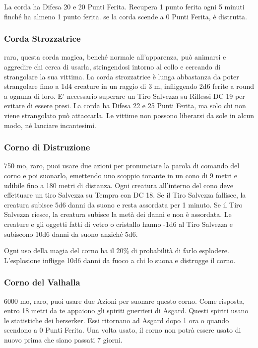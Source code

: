 \begin{multicols}{2}
La corda ha Difesa 20 e 20 Punti Ferita. Recupera 1 punto ferita ogni 5 minuti finché ha almeno 1 punto ferita. se la corda scende a 0 Punti Ferita, è distrutta.

\subsubsection*{Corda Strozzatrice}
rara, questa corda magica, benché normale all'apparenza, può animarsi e aggredire chi cerca di usarla, stringendosi intorno al collo e cercando di strangolare la sua vittima. La corda strozzatrice è lunga abbastanza da poter strangolare fimo a 1d4 creature in un raggio di 3 m, infliggendo 2d6 ferite a round a ognuna di loro. E' necessario superare un Tiro Salvezza su Riflessi DC 19 per evitare di essere presi. La corda ha Difesa 22 e 25 Punti Ferita, ma solo chi non viene strangolato può attaccarla. Le vittime non possono liberarsi da sole in alcun modo, né lanciare incantesimi.

\subsubsection*{Corno di Distruzione}
750 mo, raro, puoi usare due azioni per pronunciare la parola di comando del corno e poi suonarlo, emettendo uno scoppio tonante in un cono di 9 metri e udibile fino a 180 metri di distanza. Ogni creatura all'interno del cono deve effettuare un tiro Salvezza su Tempra con DC 18. Se il Tiro Salvezza fallisce, la creatura subisce 5d6 danni da suono e resta assordata per 1 minuto. Se il Tiro Salvezza riesce, la creatura subisce la metà dei danni e non è assordata. Le creature e gli oggetti fatti di vetro o cristallo hanno -1d6 al Tiro Salvezza e subiscono 10d6 danni da suono anziché 5d6.

Ogni uso della magia del corno ha il 20\% di probabilità di farlo esplodere. L'esplosione infligge 10d6 danni da fuoco a chi lo suona e distrugge il corno.

\subsubsection*{Corno del Valhalla}
6000 mo, raro, puoi usare due Azioni per suonare questo corno. Come risposta, entro 18 metri da te appaiono gli spiriti guerrieri di Asgard. Questi spiriti usano le statistiche dei berserker. Essi ritornano ad Asgard dopo 1 ora o quando scendono a 0 Punti Ferita. Una volta usato, il corno non potrà essere usato di nuovo prima che siano passati 7 giorni.



\end{multicols}
